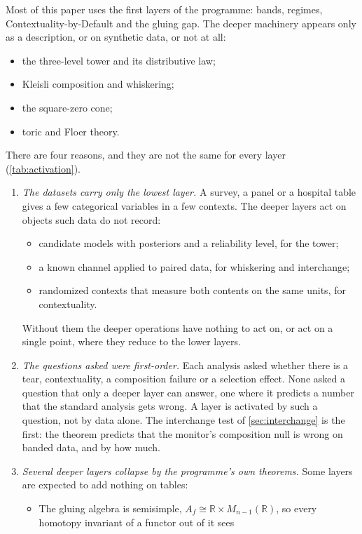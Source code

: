 \documentclass[11pt]{article}
\theoremstyle{definition}
\theoremstyle{remark}
\begin{document}
Most of this paper uses the first layers of the programme: bands, regimes, Contextuality-by-Default and the gluing gap. The deeper
machinery appears only as a description, or on synthetic data, or not at all:
\begin{itemize}[leftmargin=*,nosep]
\item the three-level tower and its distributive law;
\item Kleisli composition and whiskering;
\item the square-zero cone;
\item toric and Floer theory.
\end{itemize}
There are four reasons, and they are not the same for every layer (\cref{tab:activation}).

\begin{enumerate}[leftmargin=*]
\item \emph{The datasets carry only the lowest layer.} A survey, a panel or a hospital table gives a few categorical variables in a few
  contexts. The deeper layers act on objects such data do not record:
  \begin{itemize}[nosep]
  \item candidate models with posteriors and a reliability level, for the tower;
  \item a known channel applied to paired data, for whiskering and interchange;
  \item randomized contexts that measure both contents on the same units, for contextuality.
  \end{itemize}
  Without them the deeper operations have nothing to act on, or act on a single point, where they reduce to the lower layers.
\item \emph{The questions asked were first-order.} Each analysis asked whether there is a tear, contextuality, a composition failure or
  a selection effect. None asked a question that only a deeper layer can answer, one where it predicts a number that the standard
  analysis gets wrong. A layer is activated by such a question, not by data alone. The interchange test of \cref{sec:interchange} is the
  first: the theorem predicts that the monitor's composition null is wrong on banded data, and by how much.
\item \emph{Several deeper layers collapse by the programme's own theorems.} Some layers are expected to add nothing on tables:
  \begin{itemize}[nosep]
  \item The gluing algebra is semisimple, $A_f\cong\mathbb R\times M_{n-1}(\mathbb R)$, so every homotopy invariant of a functor out of it sees

\end{itemize}
\end{enumerate}
\end{document}
